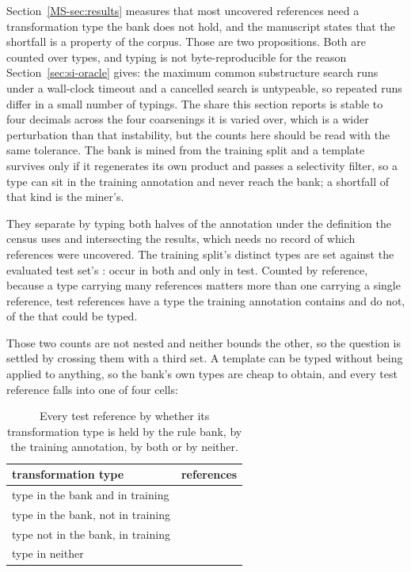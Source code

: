 \documentclass[journal=jcisd8,manuscript=suppinfo,layout=onecolumn]{achemso}
\begin{document}
Section~\ref{MS-sec:results} measures that most uncovered references need a transformation type the
bank does not hold, and the manuscript states that the shortfall is a property of the corpus. Those
are two propositions. Both are counted over types, and typing is not byte-reproducible for the
reason Section~\ref{sec:si-oracle} gives: the maximum common substructure search runs under a
wall-clock timeout and a cancelled search is untypeable, so repeated runs differ in a small number
of typings. The share this section reports is stable to four decimals across the four coarsenings
it is varied over, which is a wider perturbation than that instability, but the counts here should
be read with the same tolerance. The bank is mined from the training split and a template survives
only if it
regenerates its own product and passes a selectivity filter, so a type can sit in the training
annotation and never reach the bank; a shortfall of that kind is the miner's.

They separate by typing both halves of the annotation under the definition the census uses and
intersecting the results, which needs no record of which references were uncovered. The training
split's \numTypeoverlapTraintypes{} distinct types are set against the evaluated test set's
\numTypeoverlapTesttypes: \numTypeoverlapShared{} occur in both and
\numTypeoverlapAbsenttypes{} only in test. Counted by reference, because a type carrying many
references matters more than one carrying a single reference,
\numTypeoverlapPresentrefs{} test references have a type the training annotation contains and
\numTypeoverlapAbsentrefs{} do not, \numTypeoverlapAbsentsharePct{} of the
\numTypeoverlapTyped{} that could be typed.

Those two counts are not nested and neither bounds the other, so the question is settled by
crossing them with a third set. A template can be typed
without being applied to anything, so the bank's own \numTypeoverlapBanktypes{} types are cheap to
obtain, and every test reference falls into one of four cells:

\begin{table}[h]
\centering
\caption{Every test reference by whether its transformation type is held by the rule bank, by the
training annotation, by both or by neither.}
\label{tab:si-typeoverlap-cells}
\begin{tabular}{lr}
\toprule
transformation type & references \\
\midrule
type in the bank and in training & \numTypeoverlapInboth{} \\
type in the bank, not in training & \numTypeoverlapInbankonly{} \\
type not in the bank, in training & \numTypeoverlapMinerslost{} \\
type in neither & \numTypeoverlapCorpuslackstoo{} \\
\bottomrule
\end{tabular}
\end{table}
\end{document}
